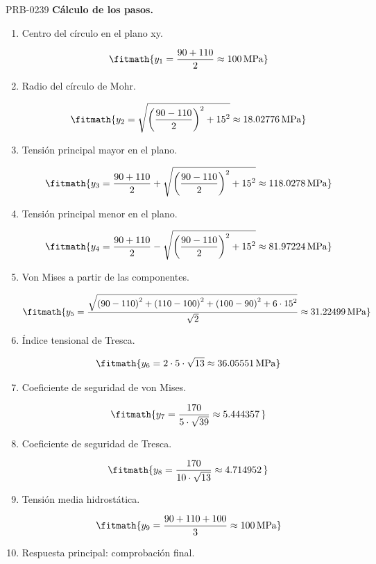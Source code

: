 \begin{studiumworked}{PRB-0239}
\textbf{Cálculo de los pasos.}

\begin{enumerate}

\item Centro del círculo en el plano xy.

\[\fitmath{y_{1}=\frac{90+110}{2}\approx 100\,\mathrm{MPa}}\]

\item Radio del círculo de Mohr.

\[\fitmath{y_{2}=\sqrt{{\left(\frac{90-110}{2}\right)}^{2}+{15}^{2}}\approx 18.02776\,\mathrm{MPa}}\]

\item Tensión principal mayor en el plano.

\[\fitmath{y_{3}=\frac{90+110}{2}+\sqrt{{\left(\frac{90-110}{2}\right)}^{2}+{15}^{2}}\approx 118.0278\,\mathrm{MPa}}\]

\item Tensión principal menor en el plano.

\[\fitmath{y_{4}=\frac{90+110}{2}-\sqrt{{\left(\frac{90-110}{2}\right)}^{2}+{15}^{2}}\approx 81.97224\,\mathrm{MPa}}\]

\item Von Mises a partir de las componentes.

\[\fitmath{y_{5}=\frac{\sqrt{{\left(90-110\right)}^{2}+{\left(110-100\right)}^{2}+{\left(100-90\right)}^{2}+6\cdot {15}^{2}}}{\sqrt{2}}\approx 31.22499\,\mathrm{MPa}}\]

\item Índice tensional de Tresca.

\[\fitmath{y_{6}=2\cdot 5\cdot \sqrt{13}\approx 36.05551\,\mathrm{MPa}}\]

\item Coeficiente de seguridad de von Mises.

\[\fitmath{y_{7}=\frac{170}{5\cdot \sqrt{39}}\approx 5.444357\,}\]

\item Coeficiente de seguridad de Tresca.

\[\fitmath{y_{8}=\frac{170}{10\cdot \sqrt{13}}\approx 4.714952\,}\]

\item Tensión media hidrostática.

\[\fitmath{y_{9}=\frac{90+110+100}{3}\approx 100\,\mathrm{MPa}}\]

\item Respuesta principal: comprobación final.


\end{enumerate}
\end{studiumworked}
